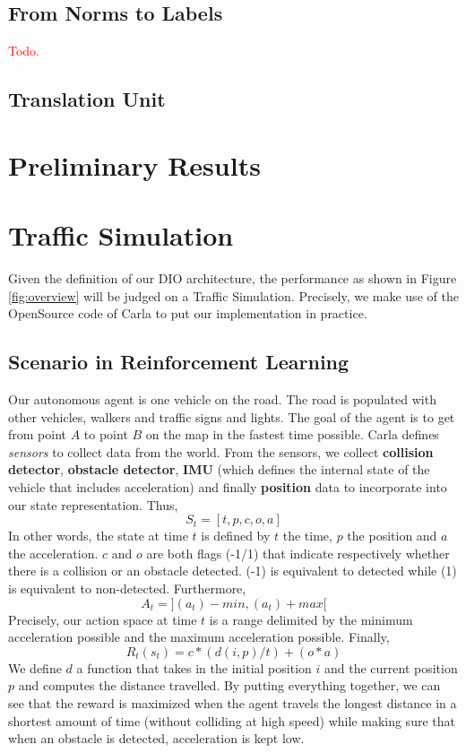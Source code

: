 \documentclass[a4paper,11pt]{article}
\theoremstyle{definition}
\begin{document}
\subsection{From Norms to Labels}
\textcolor{red}{Todo.}

\subsection{Translation Unit}

\section{Preliminary Results}

\section{Traffic Simulation} 
\label{traffic}

Given the definition of our DIO architecture, the performance as shown in Figure \ref{fig:overview} will be judged on a Traffic Simulation. 
Precisely, we make use of the OpenSource code of Carla \cite{Dosovitskiy17} to put our implementation in practice. 
\subsection{Scenario in Reinforcement Learning}
Our autonomous agent is one vehicle on the road. The road is populated with other vehicles, walkers and traffic signs and lights. 
The goal of the agent is to get from point $A$ to point $B$ on the map in the fastest time possible. Carla defines \emph{sensors} to collect 
data from the world. From the sensors, we collect \textbf{collision detector}, \textbf{obstacle detector}, \textbf{IMU} (which defines the internal state of the vehicle that includes acceleration)
and finally \textbf{position} data to incorporate into our state representation. Thus, 
\begin{equation*}
  S_t = [t, p, c, o, a]
\end{equation*} 
In other words, the state at time $t$ is defined by $t$ the time, $p$ the position and $a$ the acceleration. $c$ and $o$ are both flags (-1/1) that indicate 
respectively whether there is a collision or an obstacle detected. (-1) is equivalent to detected while (1) is equivalent to non-detected. Furthermore, 
\begin{equation*}
  A_t = ](a_t)-min, (a_t)+max[
\end{equation*}
Precisely, our action space at time $t$ is a range delimited by the minimum acceleration possible and the maximum acceleration possible. Finally, 
\begin{equation*}
  R_t(s_t) = c * (d(i, p)/t) + (o * a)
\end{equation*}
We define $d$ a function that takes in the initial position $i$ and the current position $p$ and computes the distance travelled. 
By putting everything together, we can see that the reward is maximized when the agent travels the longest distance in a shortest 
amount of time (without colliding at high speed) while making sure that when an obstacle is detected, acceleration is kept low. 
\end{document}
